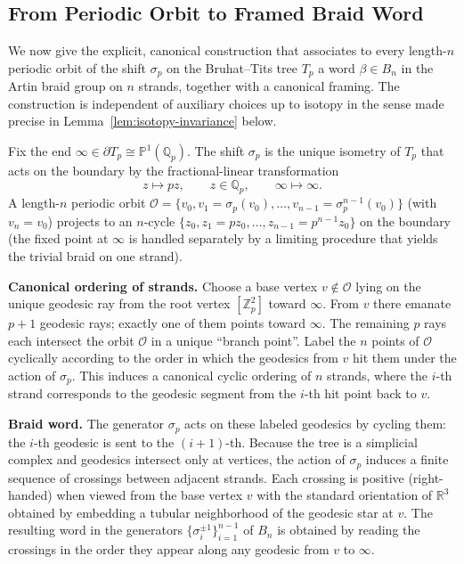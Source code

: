 \subsection{From Periodic Orbit to Framed Braid Word}
\label{subsec:braid-encoding}

We now give the explicit, canonical construction that associates to every length-\(n\) periodic orbit of the shift \(\sigma_p\) on the Bruhat--Tits tree \(T_p\) a word \(\beta\in B_n\) in the Artin braid group on \(n\) strands, together with a canonical framing. The construction is independent of auxiliary choices up to isotopy in the sense made precise in Lemma~\ref{lem:isotopy-invariance} below.

Fix the end \(\infty\in\partial T_p\cong\mathbb{P}^1(\mathbb{Q}_p)\). The shift \(\sigma_p\) is the unique isometry of \(T_p\) that acts on the boundary by the fractional-linear transformation
\[
z\mapsto pz,\qquad z\in\mathbb{Q}_p,\qquad \infty\mapsto\infty.
\]
A length-\(n\) periodic orbit \(\mathcal{O}=\{v_0,v_1=\sigma_p(v_0),\dots,v_{n-1}=\sigma_p^{n-1}(v_0)\}\) (with \(v_n=v_0\)) projects to an \(n\)-cycle \(\{z_0,z_1=pz_0,\dots,z_{n-1}=p^{n-1}z_0\}\) on the boundary (the fixed point at \(\infty\) is handled separately by a limiting procedure that yields the trivial braid on one strand).

\textbf{Canonical ordering of strands.} Choose a base vertex \(v\notin\mathcal{O}\) lying on the unique geodesic ray from the root vertex \([\mathbb{Z}_p^2]\) toward \(\infty\). From \(v\) there emanate \(p+1\) geodesic rays; exactly one of them points toward \(\infty\). The remaining \(p\) rays each intersect the orbit \(\mathcal{O}\) in a unique ``branch point''. Label the \(n\) points of \(\mathcal{O}\) cyclically according to the order in which the geodesics from \(v\) hit them under the action of \(\sigma_p\). This induces a canonical cyclic ordering of \(n\) strands, where the \(i\)-th strand corresponds to the geodesic segment from the \(i\)-th hit point back to \(v\).

\textbf{Braid word.} The generator \(\sigma_p\) acts on these labeled geodesics by cycling them: the \(i\)-th geodesic is sent to the \((i+1)\)-th. Because the tree is a simplicial complex and geodesics intersect only at vertices, the action of \(\sigma_p\) induces a finite sequence of crossings between adjacent strands. Each crossing is positive (right-handed) when viewed from the base vertex \(v\) with the standard orientation of \(\mathbb{R}^3\) obtained by embedding a tubular neighborhood of the geodesic star at \(v\). The resulting word in the generators \(\{\sigma_i^{\pm1}\}_{i=1}^{n-1}\) of \(B_n\) is obtained by reading the crossings in the order they appear along any geodesic from \(v\) to \(\infty\).

